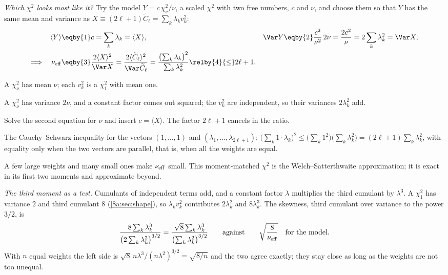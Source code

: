 \emph{Which $\chi^2$ looks most like it?} Try the model $Y=c\,\chi^2_\nu/\nu$, a scaled $\chi^2$ with two free numbers, $c$
and $\nu$, and choose them so that $Y$ has the same mean and variance as $X\equiv(2\ell+1)\widetilde C_\ell=\sum_k\lambda_kv_k^2$:
\begin{align}
  \langle Y\rangle&\eqby{1}c=\sum_k\lambda_k=\langle X\rangle,&
  \Var Y&\eqby{2}\frac{c^2}{\nu^2}\,2\nu=\frac{2c^2}\nu=2\sum_k\lambda_k^2=\Var X,
  \nonumber\\
  \Longrightarrow\quad
  \nu_{\rm eff}&\eqby{3}\frac{2\langle X\rangle^2}{\Var X}
  =\frac{2\langle\widetilde C_\ell\rangle^2}{\Var\widetilde C_\ell}
  =\frac{\bigl(\sum_k\lambda_k\bigr)^2}{\sum_k\lambda_k^2}\relby{4}{\le}2\ell+1 .
  \label{8b:eq:nu-eff}
\end{align}
\begin{explain}
  \item A $\chi^2_\nu$ has mean $\nu$; each $v_k^2$ is a $\chi^2_1$ with mean one.
  \item A $\chi^2_\nu$ has variance $2\nu$, and a constant factor comes out squared; the $v_k^2$ are independent,
        so their variances $2\lambda_k^2$ add.
  \item Solve the second equation for $\nu$ and insert $c=\langle X\rangle$. The factor $2\ell+1$ cancels in the ratio.
  \item The Cauchy--Schwarz inequality for the vectors $(1,\dots,1)$ and $(\lambda_1,\dots,\lambda_{2\ell+1})$:
        $\bigl(\sum_k1\cdot\lambda_k\bigr)^2\le\bigl(\sum_k1^2\bigr)\bigl(\sum_k\lambda_k^2\bigr)=(2\ell+1)\sum_k\lambda_k^2$, with equality only
        when the two vectors are parallel, that is, when all the weights are equal.
\end{explain}
A few large weights and many small ones make $\nu_{\rm eff}$ small. This moment-matched $\chi^2$ is the
Welch--Satterthwaite approximation; it is exact in its first two moments and approximate beyond.

\emph{The third moment as a test.} Cumulants of independent terms add, and a constant factor $\lambda$
multiplies the third cumulant by $\lambda^3$. A $\chi^2_1$ has variance $2$ and third cumulant $8$
(\cref{8a:sec:shape}), so $\lambda_kv_k^2$ contributes $2\lambda_k^2$ and $8\lambda_k^3$. The skewness, third cumulant over
variance to the power $3/2$, is
\[
  \frac{8\sum_k\lambda_k^3}{\bigl(2\sum_k\lambda_k^2\bigr)^{3/2}}=\frac{\sqrt8\sum_k\lambda_k^3}{\bigl(\sum_k\lambda_k^2\bigr)^{3/2}}
  \qquad\text{against}\qquad\sqrt{\frac8{\nu_{\rm eff}}}\quad\text{for the model.}
\]
With $n$ equal weights the left side is $\sqrt8\,n\lambda^3/(n\lambda^2)^{3/2}=\sqrt{8/n}$ and the two agree exactly; they
stay close as long as the weights are not too unequal.

